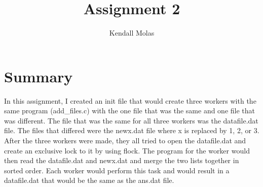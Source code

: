 \documentclass[a4paper,11pt]{report}
\title{Assignment 2}
\author{Kendall Molas}
\begin{document}
\maketitle

\section*{Summary}

In this assignment, I created an init file that would create three workers with the same program (add\_files.c) with the one file that was the same and one file that was different. The file that was the same for all three workers was the datafile.dat file. The files that differed were the newx.dat file where x is replaced by 1, 2, or 3. After the three workers were made, they all tried to open the datafile.dat and create an exclusive lock to it by using flock. The program for the worker would then read the datafile.dat and newx.dat and merge the two lists together in sorted order. Each worker would perform this task and would result in a datafile.dat that would be the same as the ans.dat file. 
\end{document}
